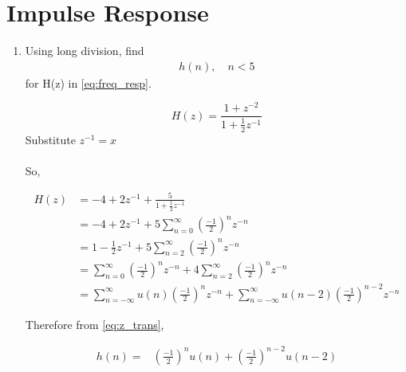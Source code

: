 \documentclass[journal,12pt,twocolumn]{IEEEtran}
\renewcommand\thesection{\arabic{section}}
\begin{document}
\section{Impulse Response}
\begin{enumerate}[label=\thesection.\arabic*]

\item Using long division, find
\begin{align}
	h(n), \quad n < 5
\end{align}
for H(z) in 
\eqref{eq:freq_resp}.

\solution
\begin{equation}
	H(z) = \frac{1 + z^{-2}}{1 + \frac12 z^{-1}}
\end{equation}
Substitute $z^{-1} = x$\\

\\

So, 

\begin{align}
H(z) & = -4 + 2z^{-1} + \frac{5}{1+ \frac{1}{2}z^{-1}}\\
& = -4 + 2z^{-1} + 5\sum_{n=0}^{\infty}\left(\frac{-1}{2}\right)^n z^{-n}\\
& = 1 - \frac{1}{2}z^{-1} + 5\sum_{n=2}^{\infty}\left(\frac{-1}{2}\right)^n z^{-n}\\
& = \sum_{n=0}^{\infty}\left(\frac{-1}{2}\right)^n z^{-n} + 4\sum_{n=2}^{\infty}\left(\frac{-1}{2}\right)^n z^{-n}\\
& = \sum_{n=-\infty}^{\infty}u(n)\left(\frac{-1}{2}\right)^n z^{-n} + \sum_{n=-\infty}^{\infty}u(n-2)\left(\frac{-1}{2}\right)^{n-2} z^{-n}
\end{align}

Therefore from \eqref{eq:z_trans},

\begin{align}
h(n) = & \left(\frac{-1}{2}\right)^nu(n) + \left(\frac{-1}{2}\right)^{n-2}u(n-2)
\end{align}
\ \\


\end{enumerate}
\end{document}
